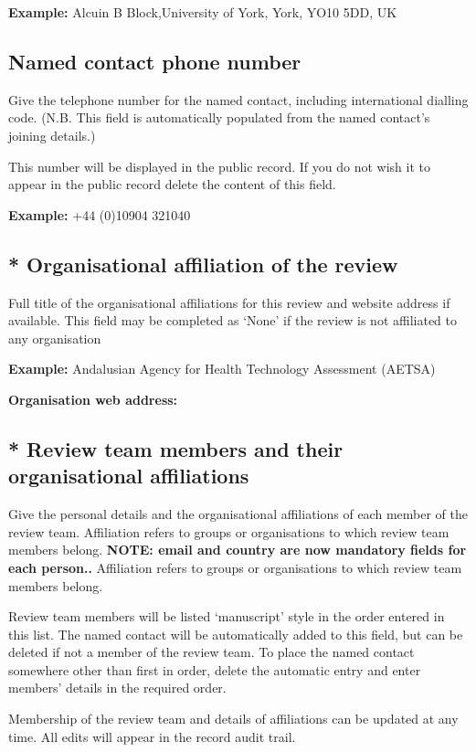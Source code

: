 \documentclass{qqtarticle}
\begin{document}
    \textbf{Example:} Alcuin B Block,University of York, York, YO10 5DD, UK

    \subsection{Named contact phone number}
    Give the telephone number for the named contact, including international dialling code.
    (N.B. This field is automatically populated from the named contact’s joining details.)

    This number will be displayed in the public record. If you do not wish it to appear in the public record delete the content of
    this field.

    \textbf{Example:} +44 (0)10904 321040

    \subsection{* Organisational affiliation of the review}
    Full title of the organisational affiliations for this review and website address if available. This field may be completed as
    ‘None’ if the review is not affiliated to any organisation

    \textbf{Example:} Andalusian Agency for Health Technology Assessment (AETSA)

    \textbf{Organisation web address:}

    \subsection{* Review team members and their organisational affiliations}
    Give the personal details and the organisational affiliations of each member of the review team. Affiliation refers to groups
    or organisations to which review team members belong. \textbf{NOTE: email and country are now mandatory fields for each
    person..} Affiliation refers to groups or organisations to which review team members belong.

    Review team members will be listed ‘manuscript’ style in the order entered in this list. The named contact will be
    automatically added to this field, but can be deleted if not a member of the review team. To place the named contact
    somewhere other than first in order, delete the automatic entry and enter members’ details in the required order.

    Membership of the review team and details of affiliations can be updated at any time.
    All edits will appear in the record audit trail.
\end{document}
